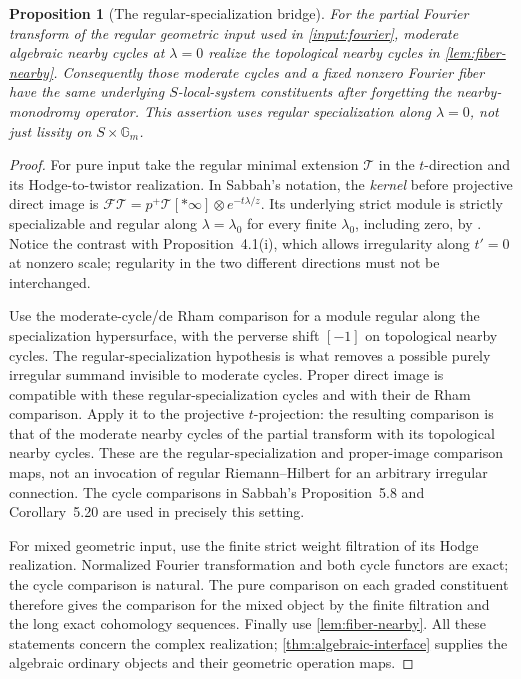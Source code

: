 \documentclass[11pt]{article}
\numberwithin{equation}{section}
\newtheorem{proposition}[proposition]{Proposition}
\theoremstyle{definition}
\theoremstyle{remark}
\newcommand{\Gm}{\mathbb G_m}
\begin{document}
\begin{proposition}[The regular-specialization bridge]
\label{prop:regular-cycle-bridge}
For the partial Fourier transform of the regular geometric input used in
\cref{input:fourier}, moderate algebraic nearby cycles at $\lambda=0$
realize the topological nearby cycles in \cref{lem:fiber-nearby}.
Consequently those moderate cycles and a fixed nonzero Fourier fiber have
the same underlying $S$-local-system constituents after forgetting the
nearby-monodromy operator. This assertion uses regular specialization
along $\lambda=0$, not just lissity on $S\times\Gm$.
\end{proposition}
\begin{proof}
For pure input take the regular minimal extension $\mathcal T$ in the
$t$-direction and its Hodge-to-twistor realization. In Sabbah's notation,
the \emph{kernel} before projective direct image is
$\mathcal F\mathcal T=p^+\mathcal T[*\infty]\otimes e^{-t\lambda/z}$.
Its underlying strict module is strictly specializable and regular along
$\lambda=\lambda_0$ for every finite $\lambda_0$, including zero, by
\cite[Proposition~4.1(ii)]{SabbahMonodromy}. Notice the contrast with
Proposition~4.1(i), which allows irregularity along $t'=0$ at nonzero
scale; regularity in the two different directions must not be interchanged.

Use the moderate-cycle/de Rham comparison for a module regular along
the specialization hypersurface, with the perverse shift $[-1]$ on
topological nearby cycles. The regular-specialization hypothesis is what
removes a possible purely irregular summand invisible to moderate cycles.
Proper direct image is compatible with these regular-specialization
cycles and with their de Rham comparison. Apply it to the projective
$t$-projection: the resulting comparison is that of the moderate nearby
cycles of the partial transform with its topological nearby cycles.
These are the regular-specialization and proper-image comparison maps,
not an invocation of regular Riemann--Hilbert for an arbitrary irregular
connection. The cycle comparisons in Sabbah's Proposition~5.8 and
Corollary~5.20 are used in precisely this setting.

For mixed geometric input, use the finite strict weight filtration of
its Hodge realization. Normalized Fourier transformation and both cycle
functors are exact; the cycle comparison is natural. The pure comparison
on each graded constituent therefore gives the comparison for the mixed
object by the finite filtration and the long exact cohomology sequences.
Finally use \cref{lem:fiber-nearby}. All these statements concern the
complex realization; \cref{thm:algebraic-interface} supplies the
algebraic ordinary objects and their geometric operation maps.
\end{proof}
\end{document}

